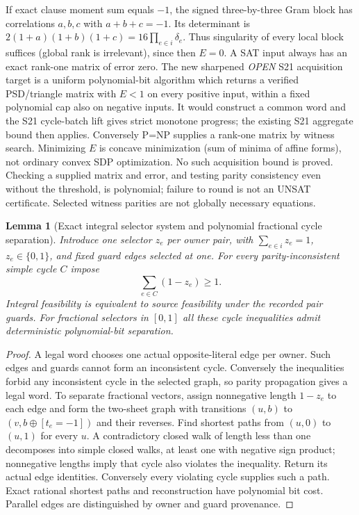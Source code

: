 \documentclass[11pt]{article}
\newtheorem{lemma}[theorem]{Lemma}
\begin{document}
If exact clause moment sum equals $-1$, the signed three-by-three Gram block has correlations $a,b,c$ with $a+b+c=-1$. Its determinant is $2(1+a)(1+b)(1+c)=16\prod_{e\in i}\delta_e$. Thus singularity of every local block suffices (global rank is irrelevant), since then $E=0$. A SAT input always has an exact rank-one matrix of error zero. The new sharpened \emph{OPEN} S21 acquisition target is a uniform polynomial-bit algorithm which returns a verified PSD/triangle matrix with $E<1$ on every positive input, within a fixed polynomial cap also on negative inputs. It would construct a common word and the S21 cycle-batch lift gives strict monotone progress; the existing S21 aggregate bound then applies. Conversely P=NP supplies a rank-one matrix by witness search. Minimizing $E$ is concave minimization (sum of minima of affine forms), not ordinary convex SDP optimization. No such acquisition bound is proved. Checking a supplied matrix and error, and testing parity consistency even without the threshold, is polynomial; failure to round is not an UNSAT certificate. Selected witness parities are not globally necessary equations.

\begin{lemma}[Exact integral selector system and polynomial fractional cycle separation]\label{lem:ms22-cycles}
Introduce one selector $z_e$ per owner pair, with $\sum_{e\in i}z_e=1$, $z_e\in\{0,1\}$, and fixed guard edges selected at one. For every parity-inconsistent simple cycle $C$ impose
\[
\sum_{e\in C}(1-z_e)\ge1 .
\]
Integral feasibility is equivalent to source feasibility under the recorded pair guards. For fractional selectors in $[0,1]$ all these cycle inequalities admit deterministic polynomial-bit separation.
\end{lemma}
\begin{proof}
A legal word chooses one actual opposite-literal edge per owner. Such edges and guards cannot form an inconsistent cycle. Conversely the inequalities forbid any inconsistent cycle in the selected graph, so parity propagation gives a legal word. To separate fractional vectors, assign nonnegative length $1-z_e$ to each edge and form the two-sheet graph with transitions $(u,b)$ to $(v,b\oplus [t_e=-1])$ and their reverses. Find shortest paths from $(u,0)$ to $(u,1)$ for every $u$. A contradictory closed walk of length less than one decomposes into simple closed walks, at least one with negative sign product; nonnegative lengths imply that cycle also violates the inequality. Return its actual edge identities. Conversely every violating cycle supplies such a path. Exact rational shortest paths and reconstruction have polynomial bit cost. Parallel edges are distinguished by owner and guard provenance.
\end{proof}
\end{document}
